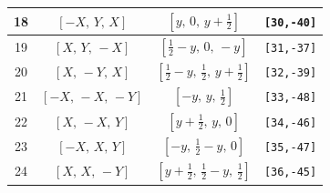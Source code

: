\documentclass[fleqn,8pt]{jsarticle}
\begin{document}
\begin{longtable}{cccc}
18 & $\left[ - X,\, Y,\, X \right]$ & $\left[ y,\, 0,\, y + \frac{1}{2} \right]$ & {\tt [30,-40]} \\ \hline
19 & $\left[ X,\, Y,\, - X \right]$ & $\left[ \frac{1}{2} - y,\, 0,\, - y \right]$ & {\tt [31,-37]} \\ \hline
20 & $\left[ X,\, - Y,\, X \right]$ & $\left[ \frac{1}{2} - y,\, \frac{1}{2},\, y + \frac{1}{2} \right]$ & {\tt [32,-39]} \\ \hline
21 & $\left[ - X,\, - X,\, - Y \right]$ & $\left[ - y,\, y,\, \frac{1}{2} \right]$ & {\tt [33,-48]} \\ \hline
22 & $\left[ X,\, - X,\, Y \right]$ & $\left[ y + \frac{1}{2},\, y,\, 0 \right]$ & {\tt [34,-46]} \\ \hline
23 & $\left[ - X,\, X,\, Y \right]$ & $\left[ - y,\, \frac{1}{2} - y,\, 0 \right]$ & {\tt [35,-47]} \\ \hline
24 & $\left[ X,\, X,\, - Y \right]$ & $\left[ y + \frac{1}{2},\, \frac{1}{2} - y,\, \frac{1}{2} \right]$ & {\tt [36,-45]} \\
\end{longtable}
\renewcommand{\arraystretch}{1.2}
\end{document}
